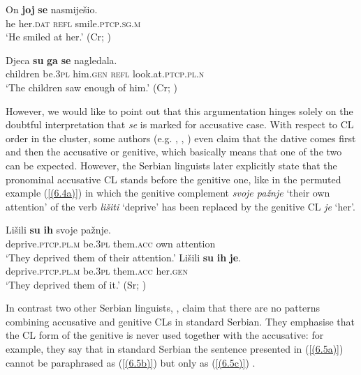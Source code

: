 \begin{exe}\ex\label{(6.2)}
\gll On \textbf{joj} \textbf{se} nasmiješio. \\
 he her\textsc{.dat} \textsc{refl} smile\textsc{.ptcp.sg.m} \\
 \glt ‘He smiled at her.’ 
\hfill  (Cr; \citealt[596]{Baric97})

\ex\label{(6.3)}
\gll Djeca \textbf{su} \textbf{ga} \textbf{se} nagledala. \\
 children be\textsc{.3pl} him\textsc{.gen} \textsc{refl} look.at\textsc{.ptcp.pl.n} \\
 \glt ‘The children saw enough of him.’ 
\hfill  (Cr; \citealt[597]{Baric97})
\end{exe}

\noindent However, we would like to point out that this argumentation hinges solely on the doubtful interpretation that \textit{se} is marked for accusative case. With respect to CL order in the cluster, some authors (e.g. \citealt[104]{PiperIvic05}, \citealt[564]{Ridjanovic12}, \citealt[451]{PiperKlajn14}) even claim that the dative comes first and then the accusative or genitive, which basically means that one of the two can be expected. However, the Serbian linguists \citet[452]{PiperKlajn14} later explicitly state that the pronominal accusative CL stands before the genitive one, like in the permuted example (\ref{(6.4a)}) in which the genitive complement \textit{svoje pažnje} ‘their own attention’ of the verb \textit{lišiti} ‘deprive’ has been replaced by the genitive CL \textit{je} ‘her’.

\begin{exe}\ex\begin{xlist}
\ex\label{(6.4a)}
\gll Lišili \textbf{su} \textbf{ih} svoje pažnje. \\
 deprive\textsc{.ptcp.pl.m} be\textsc{.3pl} them\textsc{.acc} own attention \\
\glt ‘They deprived them of their attention.’ 
\ex\label{(6.4b)}
\gll Lišili \textbf{su} \textbf{ih} \textbf{je}. \\
 deprive\textsc{.ptcp.pl.m} be\textsc{.3pl} them\textsc{.acc} her\textsc{.gen} \\
 \glt ‘They deprived them of it.’ 
\hfill (Sr; \citealt[452]{PiperKlajn14})
\end{xlist}
\end{exe}

\noindent In contrast two other Serbian linguists, \citet[659]{MrazovicVukadinovic09}, claim that there are no patterns combining accusative and genitive CLs in standard Serbian. They emphasise that the CL form of the genitive is never used together with the accusative: for example, they say that in standard Serbian the sentence presented in (\ref{(6.5a)}) cannot be paraphrased as (\ref{(6.5b)}) but only as (\ref{(6.5c)}) \citep[cf.][659]{MrazovicVukadinovic09}. 
 
